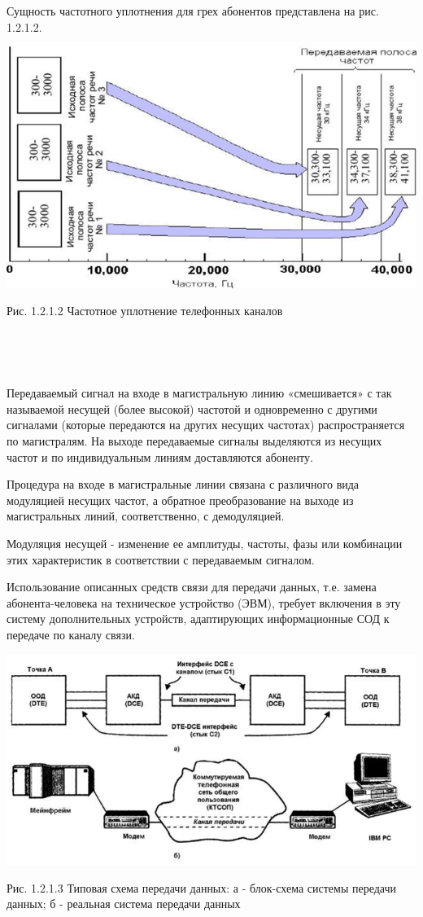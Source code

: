 \documentclass[a4paper]{report}
\begin{document}
Сущность частотного уплотнения для грех абонентов представлена на рис. 1.2.1.2.

\bigskip
\includegraphics[scale=1.4]{67}
{\centering\caption{\newline Рис. 1.2.1.2 Частотное уплотнение телефонных каналов}\\}
~

Передаваемый сигнал на входе в магистральную линию «смешивается» с так называемой несущей (более высокой) частотой и одновременно с другими сигналами (которые передаются на других несущих частотах) распространяется по магистралям. На выходе передаваемые сигналы выделяются из несущих частот и по индивидуальным линиям доставляются абоненту.

Процедура на входе в магистральные линии связана с различного вида модуляцией несущих частот, а обратное преобразование на выходе из магистральных линий, соответственно, с демодуляцией.

Модуляция несущей - изменение ее амплитуды, частоты, фазы или комбинации этих характеристик в соответствии с передаваемым сигналом.

Использование описанных средств связи для передачи данных, т.е. замена абонента-человека на техническое устройство (ЭВМ), требует включения в эту систему дополнительных устройств, адаптирующих информационные СОД к передаче по каналу связи.

\newpage
\includegraphics[scale=1.4]{68}
{\centering\caption{\newline Рис. 1.2.1.3 Типовая схема передачи данных: а - блок-схема системы передачи данных; б - реальная система передачи данных}\\}
\end{document}
